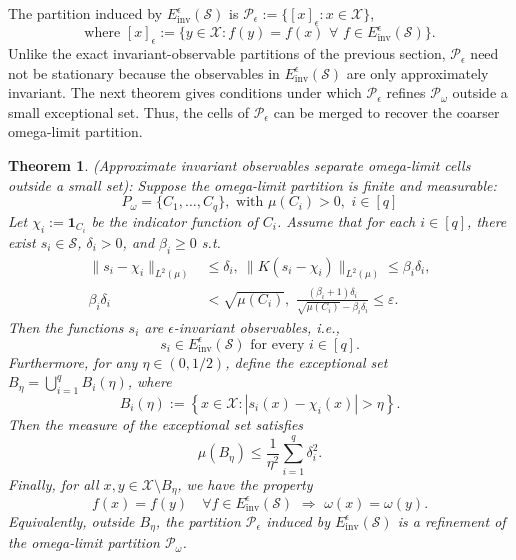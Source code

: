 \documentclass[letterpaper, 10 pt, conference]{ieeeconf}
\newcommand{\Pc}{\mathcal{P}}
\newcommand{\Sc}{\mathcal{S}}
\newcommand{\Xc}{\mathcal{X}}
\newcommand{\longthmtitle}[1]{\mbox{}{\textit{(#1):}}}
\newtheorem{theorem}{Theorem}[section]
\begin{document}
The partition induced by $E_{\text{inv}}^{\epsilon}(\Sc)$ is $\mathcal P_{\epsilon} := \{[x]_{\epsilon}: x \in \Xc\}$, 
\begin{equation}
    \text{where } [x]_{\epsilon} := \{y \in \Xc: f(y) = f(x) \,\, \forall \,\, f \in E_{\text{inv}}^{\epsilon}(\Sc)\}.
\end{equation}
Unlike the exact invariant-observable partitions of the previous section, $\Pc_{\epsilon}$ need not be stationary because the observables in $E_{\text{inv}}^{\epsilon}(\Sc)$ are only approximately invariant. The next theorem gives conditions under which $\Pc_{\epsilon}$ refines $\mathcal P_\omega$ outside a small exceptional set. Thus, the cells of $\Pc_{\epsilon}$ can be merged to recover the coarser omega-limit partition.

\begin{theorem}\longthmtitle{Approximate invariant observables separate omega-limit cells outside a small set}
Suppose the omega-limit partition is finite and measurable:
\begin{equation}
    P_\omega=\{C_1,\dots,C_q\},\,\, \text{with }\mu(C_i)>0,
    \,\, i \in [q]  
\end{equation}
Let $\chi_i:=\mathbf{1}_{C_i}$ be the indicator function of $C_i$. Assume that for each $i \in [q]$, there exist $s_i\in \Sc$, $\delta_i>0$, and $\beta_i \geq 0$ s.t.
\begin{align}
    \|{s_i-\chi_i}\|_{L^2(\mu)} &\leq \delta_i,\
    \|{K(s_i-\chi_i)}\|_{L^2(\mu)} \leq \beta_i\delta_i, \label{eqn:approx_indicator} \\  
    \beta_i \delta_i &< \sqrt{\mu(C_i)}, \,\,
    \frac{(\beta_i+1)\delta_i}
    {\sqrt{\mu(C_i)}-\beta_i\delta_i}
    \leq \varepsilon. \label{eq:epsilon_condition}
\end{align}
Then the functions $s_i$ are $\epsilon$-invariant observables, i.e.,
\begin{equation}
s_i\in E_{\text{inv}}^{\epsilon}(\Sc) \text{ for every } i \in [q].
\end{equation}
Furthermore, for any $\eta\in(0,1/2)$, define the exceptional set $B_\eta = \bigcup_{i=1}^q B_i(\eta)$, where
\begin{equation}
B_i(\eta) :=\left\{x\in \Xc:|s_i(x)-\chi_i(x)|>\eta\right\}.
\end{equation}
Then the measure of the exceptional set satisfies
\begin{equation}
\mu(B_\eta) \leq \frac{1}{\eta^2} \sum_{i=1}^q \delta_i^2.  
\end{equation}
Finally, for all $x,y\in \Xc\setminus B_\eta$, we have the property
\begin{equation}
f(x)=f(y) \quad\forall f\in E_{\text{inv}}^{\epsilon}(\Sc) \,\, \Longrightarrow \,\, \omega(x)=\omega(y).
\label{eqn:refinement_result}
\end{equation}
Equivalently, outside $B_\eta$, the partition $\Pc_{\epsilon}$ induced by $E_{\text{inv}}^{\epsilon}(\Sc)$ is a refinement of the omega-limit partition $\mathcal P_\omega$.
\label{thm:main_result}
\end{theorem}
\end{document}
